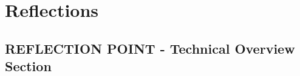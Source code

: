\documentclass{l3proj}
\begin{document}
\section{Reflections}
\label{sec:reflections}









\subsection{REFLECTION POINT - Technical Overview Section}
\label{sec:techoverviewreflection}


\end{document}
